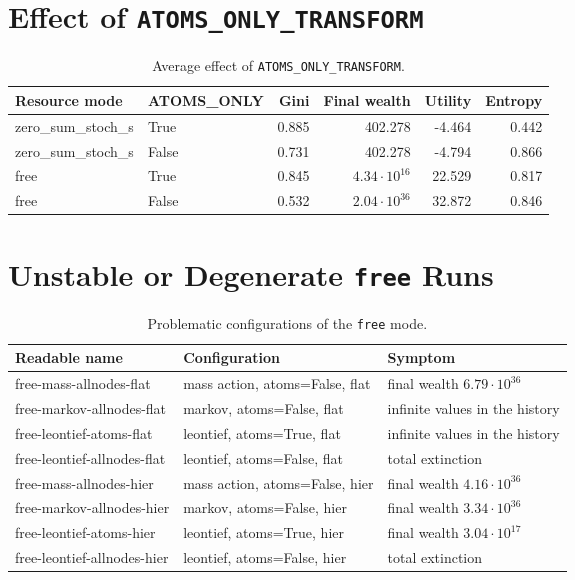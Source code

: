\documentclass[11pt]{article}
\begin{document}
\section{Effect of \texttt{ATOMS\_ONLY\_TRANSFORM}}

\begin{table}[H]
\centering
\scriptsize
\begin{tabular}{llrrrr}
\toprule
Resource mode & ATOMS\_ONLY & Gini & Final wealth & Utility & Entropy \\
\midrule
zero\_sum\_stoch\_s & True & 0.885 & 402.278 & -4.464 & 0.442 \\
zero\_sum\_stoch\_s & False & 0.731 & 402.278 & -4.794 & 0.866 \\
free & True & 0.845 & $4.34 \cdot 10^{16}$ & 22.529 & 0.817 \\
free & False & 0.532 & $2.04 \cdot 10^{36}$ & 32.872 & 0.846 \\
\bottomrule
\end{tabular}
\caption{Average effect of \texttt{ATOMS\_ONLY\_TRANSFORM}.}
\end{table}

\section{Unstable or Degenerate \texttt{free} Runs}

\begin{table}[H]
\centering
\scriptsize
\begin{tabular}{lll}
\toprule
Readable name & Configuration & Symptom \\
\midrule
free-mass-allnodes-flat & mass action, atoms=False, flat & final wealth $6.79 \cdot 10^{36}$ \\
free-markov-allnodes-flat & markov, atoms=False, flat & infinite values in the history \\
free-leontief-atoms-flat & leontief, atoms=True, flat & infinite values in the history \\
free-leontief-allnodes-flat & leontief, atoms=False, flat & total extinction \\
free-mass-allnodes-hier & mass action, atoms=False, hier & final wealth $4.16 \cdot 10^{36}$ \\
free-markov-allnodes-hier & markov, atoms=False, hier & final wealth $3.34 \cdot 10^{36}$ \\
free-leontief-atoms-hier & leontief, atoms=True, hier & final wealth $3.04 \cdot 10^{17}$ \\
free-leontief-allnodes-hier & leontief, atoms=False, hier & total extinction \\
\bottomrule
\end{tabular}
\caption{Problematic configurations of the \texttt{free} mode.}
\end{table}
\end{document}
